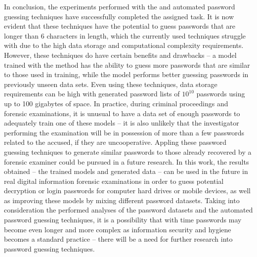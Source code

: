 \documentclass{VUMIFInfBakalaurinis}
\begin{document}
In conclusion, the experiments performed with the  and 
 automated password guessing techniques have successfully completed 
the assigned task. It is now evident that these techniques have the potential to 
guess passwords that are longer than 6 characters in length, which the currently 
used techniques struggle with due to the high data storage and computational 
complexity requirements. However, these techniques do have certain benefits and 
drawbacks -- a model trained with the  method has the ability to 
guess more passwords that are similar to those used in training, while the 
 model performs better guessing passwords in previously 
unseen data sets. Even using these techniques, data storage requirements can be 
high with generated password lists of $10^{10}$ passwords using up to 100 
gigabytes of space. In practice, during criminal proceedings and forensic 
examinations, it is unusual to have a data set of enough passwords to adequately 
train one of these models -- it is also unlikely that the investigator 
performing the examination will be in possession of more than a few passwords 
related to the accused, if they are uncooperative. Appling these password 
guessing techniques to generate similar passwords to those already recovered by a 
forensic examiner could be pursued in a future research. In this work, the 
results obtained -- the trained models and generated data -- can be used in the 
future in real digital information forensic examinations in order to guess 
potential decryption or login passwords for computer hard drives or mobile 
devices, as well as improving these models by mixing different password 
datasets. Taking into consideration the performed analyses of the password 
datasets and the automated password guessing techniques, it is a possibility that 
with time passwords may become even longer and more complex as information 
security and hygiene becomes a standard practice -- there will be a need for 
further research into password guessing techniques.

\printbibliography[heading=bibintoc]

\appendix
\end{document}
